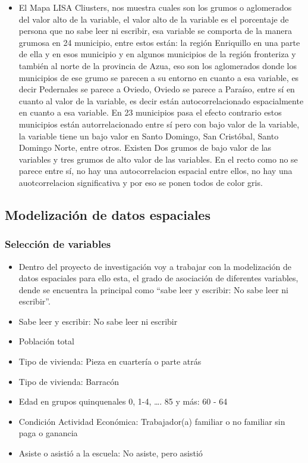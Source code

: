 \documentclass[11pt,]{article}
\providecommand{\tightlist}{%
\setlength{\itemsep}{0pt}\setlength{\parskip}{0pt}}
\begin{document}
\begin{itemize}
\tightlist
\item
  El Mapa LISA Cliusters, nos muestra cuales son los grumos o
  aglomerados del valor alto de la variable, el valor alto de la
  variable es el porcentaje de persona que no sabe leer ni escribir, esa
  variable se comporta de la manera grumosa en 24 municipio, entre estos
  están: la región Enriquillo en una parte de ella y en esos municipio y
  en algunos municipios de la región fronteriza y también al norte de la
  provincia de Azua, eso son los aglomerados donde los municipios de ese
  grumo se parecen a su entorno en cuanto a esa variable, es decir
  Pedernales se parece a Oviedo, Oviedo se parece a Paraíso, entre sí en
  cuanto al valor de la variable, es decir están autocorrelacionado
  espacialmente en cuanto a esa variable. En 23 municipios pasa el
  efecto contrario estos municipios están autorrelacionado entre sí pero
  con bajo valor de la variable, la variable tiene un bajo valor en
  Santo Domingo, San Cristóbal, Santo Domingo Norte, entre otros.
  Existen Dos grumos de bajo valor de las variables y tres grumos de
  alto valor de las variables. En el recto como no se parece entre sí,
  no hay una autocorrelacion espacial entre ellos, no hay una
  auotcorrelacion significativa y por eso se ponen todos de color gris.
\end{itemize}

\subsection{Modelización de datos
espaciales}\label{modelizaciuxf3n-de-datos-espaciales-1}

\subsubsection{Selección de variables}\label{selecciuxf3n-de-variables}

\begin{itemize}
\item
  Dentro del proyecto de investigación voy a trabajar con la
  modelización de datos espaciales para ello esta, el grado de
  asociación de diferentes variables, dende se encuentra la principal
  como ``sabe leer y escribir: No sabe leer ni escribir''.
\item
  Sabe leer y escribir: No sabe leer ni escribir
\item
  Población total
\item
  Tipo de vivienda: Pieza en cuartería o parte atrás
\item
  Tipo de vivienda: Barracón
\item
  Edad en grupos quinquenales 0, 1-4, \ldots{}. 85 y más: 60 - 64
\item
  Condición Actividad Económica: Trabajador(a) familiar o no familiar
  sin paga o ganancia
\item
  Asiste o asistió a la escuela: No asiste, pero asistió
\end{itemize}
\end{document}
